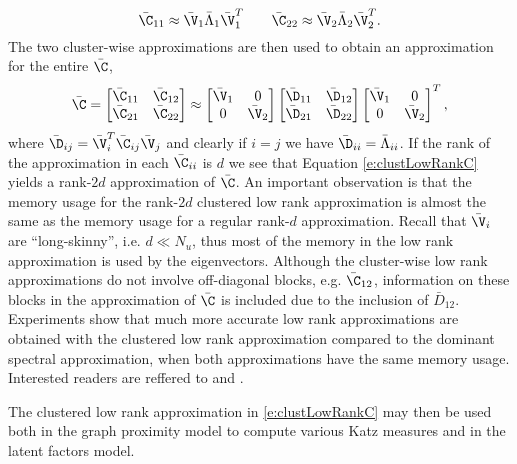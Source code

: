 \[
\bar{\C}_{11} \approx \bar{\V}_1 \bar{\Lambda}_1 \bar{\V}_1^T \qquad  
\bar{\C}_{22} \approx \bar{\V}_2 \bar{\Lambda}_2 \bar{\V}_2^T.
\]
The two cluster-wise approximations are then used to obtain an approximation for the entire $\bar{\C}$,
\begin{equation}
 \label{e:clustLowRankC}
 \bar{\C} = 
\begin{bmatrix}
\bar{\C}_{11} & \bar{\C}_{12} \\
\bar{\C}_{21} & \bar{\C}_{22}
\end{bmatrix} \approx
\begin{bmatrix}
\bar{\V}_1 & 0 \\
0 & \bar{\V}_2
\end{bmatrix}
\begin{bmatrix}
\bar{\D}_{11} & \bar{\D}_{12} \\
\bar{\D}_{21} & \bar{\D}_{22}
\end{bmatrix}
\begin{bmatrix}
\bar{\V}_1 & 0 \\
0 & \bar{\V}_2
\end{bmatrix}^T,
\end{equation}
where $\bar{\D}_{ij} = \bar{\V}_i^T \bar{\C}_{ij} \bar{\V}_j$ and clearly if $i = j$ we have $\bar{\D}_{ii} = \bar{\Lambda}_{ii}$. If the rank of the approximation in each $\bar{\C}_{ii}$ is $d$ we see that Equation \eqref{e:clustLowRankC} yields a rank-$2d$ approximation of $\bar{\C}$. An important observation is that the memory usage for the rank-$2d$ clustered low rank approximation is almost the same as the memory usage for a regular rank-$d$ approximation. Recall that $\bar{\V}_i$ are ``long-skinny'', i.e. $d \ll N_u$, thus most of the memory in the low rank approximation is used by the eigenvectors. Although the cluster-wise low rank approximations do not involve off-diagonal blocks, e.g. $\bar{\C}_{12}$, information on these blocks in the approximation of $\bar{\C}$ is included due to the inclusion of $\bar{D}_{12}$. Experiments show that much more accurate low rank approximations are obtained with the clustered low rank approximation compared to the dominant spectral approximation, when both approximations have the same memory usage. Interested readers are reffered to \cite{savas10c} and \cite{song10}.

The clustered low rank approximation in \eqref{e:clustLowRankC} may then be used both in the graph proximity model to compute various \textsf{Katz} measures and in the latent factors model.



